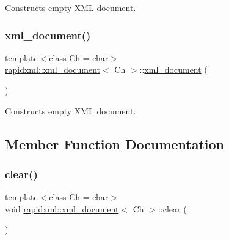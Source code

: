Constructs empty X\+ML document. 

\mbox{\label{classrapidxml_1_1xml__document_aae8841b15085ba8f32ff46587ace28f5}} 
\subsubsection{\texorpdfstring{xml\+\_\+document()}{xml\_document()}\hspace{0.1cm}{\footnotesize\ttfamily [2/2]}}
{\footnotesize\ttfamily template$<$class Ch  = char$>$ \\
\mbox{\hyperlink{classrapidxml_1_1xml__document}{rapidxml\+::xml\+\_\+document}}$<$ Ch $>$\+::\mbox{\hyperlink{classrapidxml_1_1xml__document}{xml\+\_\+document}} (\begin{DoxyParamCaption}{ }\end{DoxyParamCaption})\hspace{0.3cm}{\ttfamily [inline]}}



Constructs empty X\+ML document. 



\subsection{Member Function Documentation}
\mbox{\label{classrapidxml_1_1xml__document_a826929ff54242532198701f19ff5f83f}} 
\subsubsection{\texorpdfstring{clear()}{clear()}\hspace{0.1cm}{\footnotesize\ttfamily [1/2]}}
{\footnotesize\ttfamily template$<$class Ch  = char$>$ \\
void \mbox{\hyperlink{classrapidxml_1_1xml__document}{rapidxml\+::xml\+\_\+document}}$<$ Ch $>$\+::clear (\begin{DoxyParamCaption}{ }\end{DoxyParamCaption})\hspace{0.3cm}{\ttfamily [inline]}}

